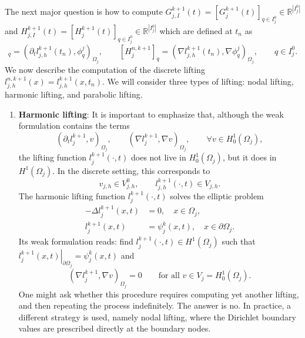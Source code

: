 \documentclass[a4paper, 11pt]{article}
\theoremstyle{remark}
\begin{document}
\noindent The next major question is how to compute $G_{j, I}^{k+1}(t) = [G^{k+1}_{j}(t)]_{q\in I^{0}_{j}}\in\mathbb{R}^{|I_j^0|}$ and 
$H_{j, I}^{k+1}(t) = [H^{k+1}_{j}(t)]_{q\in I^{0}_{j}}\in\mathbb{R}^{|I_j^0|}$ which are defined at $t_n$ as
\begin{equation*}
    [G^{n, k+1}_{j}]_q = (\partial_t l_{j, h}^{k+1}(t_{n}), \phi_{q}^{j})_{\Omega_j}, \qquad
    [H^{n, k+1}_{j}]_q = (\nabla l_{j, h}^{k+1}(t_{n}), \nabla \phi_{q}^{j})_{\Omega_j}, \qquad q\in I^{0}_{j}.
\end{equation*}
We now describe the computation of the discrete lifting $l_{j, h}^{n, k+1}(x) = l_{j, h}^{k+1}(x, t_{n})$. We will consider three types of lifting:
nodal lifting, harmonic lifting, and parabolic lifting.
\begin{enumerate}[label = (\arabic*)]
    \item \textbf{Harmonic lifting}: It is important to emphasize that, although the weak formulation contains the terms
\begin{equation*}
    \left(\partial_{t} l_{j}^{k+1}, v\right)_{\Omega_{j}}, \qquad \left(\nabla l_{j}^{k+1}, \nabla v\right)_{\Omega_{j}}, \qquad \forall v \in H^{1}_{0}(\Omega_{j}),
\end{equation*}
the lifting function $l_{j}^{k+1}(\cdot, t)$ does not live in $H^{1}_{0}(\Omega_{j})$, but it does in $H^{1}(\Omega_{j})$. In the discrete setting, this corresponds to
\begin{equation*}
    v_{j, h}\in V^{0}_{j, h}, \qquad l_{j, h}^{k+1}(\cdot, t)\in V_{j, h}.
\end{equation*}
The harmonic lifting function $l_{j}^{k+1}(\cdot, t)$ solves the elliptic problem
\begin{align*}
    -\Delta l_{j}^{k+1}(x, t) &= 0, \quad x\in\Omega_j,\\
    l_{j}^{k+1}(x, t) &= \psi_{j}^{k}(x, t), \quad x\in \partial\Omega_j.
\end{align*}
Its weak formulation reads: find $l_{j}^{k+1}(\cdot, t)\in H^{1}(\Omega_{j})$ such that $\left.l_{j}^{k+1}(x, t)\right|_{\partial\Omega_{j}} = \psi_{j}^{k}(x, t)$ and
\begin{equation*}
    \left(\nabla l_{j}^{k+1}, \nabla v\right)_{\Omega_{j}} = 0 \qquad \text{for all } v\in V_{j} = H^{1}_{0}(\Omega_{j}).
\end{equation*}
One might ask whether this procedure requires computing yet another lifting, and then repeating the process indefinitely. The answer is no. In practice, a different strategy is used, namely nodal lifting, where the Dirichlet boundary values are prescribed directly at the boundary nodes. 


\end{enumerate}
\end{document}
